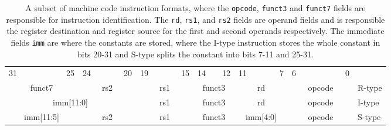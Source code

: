     \begin{table}[h!]
        \scriptsize
        \begin{tabular} %
            {p{0.01mm}p{0.01mm}p{0.01mm}p{0.01mm} p{0.01mm}p{0.01mm}p{0.01mm}p{0.01mm}
                p{0.01mm}p{0.01mm}p{0.01mm}p{0.01mm} p{0.01mm}p{0.01mm}p{0.01mm}p{0.01mm}
                p{0.01mm}p{0.01mm}p{0.01mm}p{0.01mm} p{0.01mm}p{0.01mm}p{0.01mm}p{0.01mm}
                p{0.01mm}p{0.01mm}p{0.01mm}p{0.01mm} p{0.01mm}p{0.01mm}p{0.01mm}p{0.01mm} l}
            \multicolumn{1}{c}{31}&&&&&&
            \multicolumn{1}{c}{25}&
            \multicolumn{1}{c}{24}&&&&
            \multicolumn{1}{c}{20}&
            \multicolumn{1}{c}{19}&&&&
            \multicolumn{1}{c}{15}&
            \multicolumn{1}{c}{14}&&
            \multicolumn{1}{c}{12}&
            \multicolumn{1}{c}{11}&&&&
            \multicolumn{1}{c}{7}&
            \multicolumn{1}{c}{6}&&&&&&
            \multicolumn{1}{c}{0}&
            \\
            \cline{0-31} 
            \multicolumn{7}{|c|}{funct7} &
            \multicolumn{5}{c|}{rs2}&
            \multicolumn{5}{c|}{rs1}&
            \multicolumn{3}{c|}{funct3}&
            \multicolumn{5}{c|}{rd}&
            \multicolumn{7}{c|}{opcode}&
            R-type
            \\
            \cline{0-31} 
            \multicolumn{12}{|c|}{imm[11:0]} &
            \multicolumn{5}{c|}{rs1}&
            \multicolumn{3}{c|}{funct3}&
            \multicolumn{5}{c|}{rd}&
            \multicolumn{7}{c|}{opcode}&
            I-type
            \\
            \cline{0-31} 
            \multicolumn{7}{|c|}{imm[11:5]} &
            \multicolumn{5}{c|}{rs2}&
            \multicolumn{5}{c|}{rs1}&
            \multicolumn{3}{c|}{funct3}&
            \multicolumn{5}{c|}{imm[4:0]}&
            \multicolumn{7}{c|}{opcode}&
            S-type
            \\
            \cline{0-31} 
        \end{tabular}
        \caption{A subset of machine code instruction formats, where the \texttt{opcode}, \texttt{funct3} and \texttt{funct7} fields are responsible for instruction identification. The \texttt{rd}, \texttt{rs1}, and \texttt{rs2} fields are operand fields and is responsible the register destination and register source for the first and second operands respectively. The immediate fields \texttt{imm} are where the constants are stored, where the I-type instruction stores the whole constant in bits 20-31 and S-type splits the constant into bits 7-11 and 25-31.}
        \label{table:InstructionFormats}
    \end{table}

